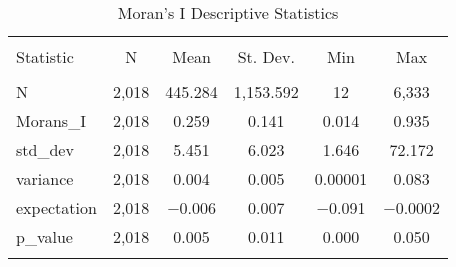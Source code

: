 \begin{table}[!htbp] \centering 
    \caption{Moran's I Descriptive Statistics} 
    \label{moran_desc} 
  \begin{tabular}{@{\extracolsep{5pt}}lccccc} 
  \\[-1.8ex]\hline 
  \hline \\[-1.8ex] 
  Statistic & \multicolumn{1}{c}{N} & \multicolumn{1}{c}{Mean} & \multicolumn{1}{c}{St. Dev.} & \multicolumn{1}{c}{Min} & \multicolumn{1}{c}{Max} \\ 
  \hline \\[-1.8ex] 
  N & 2,018 & 445.284 & 1,153.592 & 12 & 6,333 \\
  \hline 
  Morans\_I & 2,018 & 0.259 & 0.141 & 0.014 & 0.935 \\ 
  \hline
  std\_dev & 2,018 & 5.451 & 6.023 & 1.646 & 72.172 \\ 
  \hline
  variance & 2,018 & 0.004 & 0.005 & 0.00001 & 0.083 \\
  \hline 
  expectation & 2,018 & $-$0.006 & 0.007 & $-$0.091 & $-$0.0002 \\ 
  \hline
  p\_value & 2,018 & 0.005 & 0.011 & 0.000 & 0.050 \\ 
  \hline \\[-1.8ex] 
  \end{tabular} 
  \end{table} 